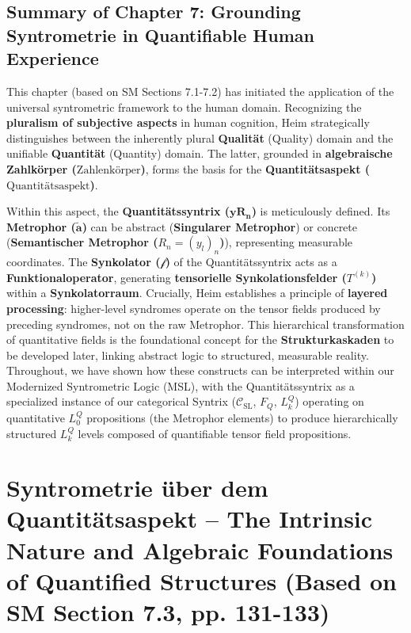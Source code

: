 \documentclass[
    12pt,              %
    a4paper,           %
    headings=normal,   %
    twoside=true,      %
    BCOR=8mm,          %
]{scrbook}
\newcommand{\metrophor}{\bm{\widetilde{a}}}
\newcommand{\quantitaetsaspekt}{\text{Quantitätsaspekt}}
\newcommand{\quantitaetssyntrix}{\bm{yR_n}}
\newcommand{\zahlenkoerper}{\text{Zahlenkörper}}
\newcommand{\semantischermetrophor}{R_n}
\newcommand{\funktionaloperator}{\mathcal{f}}
\begin{document}
\section{Summary of Chapter 7: Grounding Syntrometrie in Quantifiable Human Experience}
\label{sec:ch7_3_summary}

This chapter (based on SM Sections 7.1-7.2) has initiated the application of the universal syntrometric framework to the human domain. Recognizing the \textbf{pluralism of subjective aspects} in human cognition, Heim strategically distinguishes between the inherently plural \textbf{Qualität} (Quality) domain and the unifiable \textbf{Quantität} (Quantity) domain. The latter, grounded in \textbf{algebraische Zahlkörper (\(\zahlenkoerper\))}, forms the basis for the \textbf{Quantitätsaspekt (\(\quantitaetsaspekt\))}.

Within this aspect, the \textbf{Quantitätssyntrix (\(\quantitaetssyntrix\))} is meticulously defined. Its \textbf{Metrophor (\(\metrophor\))} can be abstract (\textbf{Singularer Metrophor}) or concrete (\textbf{Semantischer Metrophor (\(\semantischermetrophor = (y_l)_n\))}), representing measurable coordinates. The \textbf{Synkolator (\(\funktionaloperator\))} of the Quantitätssyntrix acts as a \textbf{Funktionaloperator}, generating \textbf{tensorielle Synkolationsfelder (\(T^{(k)}\))} within a \textbf{Synkolatorraum}. Crucially, Heim establishes a principle of \textbf{layered processing}: higher-level syndromes operate on the tensor fields produced by preceding syndromes, not on the raw Metrophor. This hierarchical transformation of quantitative fields is the foundational concept for the \textbf{Strukturkaskaden} to be developed later, linking abstract logic to structured, measurable reality. Throughout, we have shown how these constructs can be interpreted within our Modernized Syntrometric Logic (MSL), with the Quantitätssyntrix as a specialized instance of our categorical Syntrix (\(\mathcal{C}_{\text{SL}}\), \(F_Q\), \(L_k^Q\)) operating on quantitative \(L_0^Q\) propositions (the Metrophor elements) to produce hierarchically structured \(L_k^Q\) levels composed of quantifiable tensor field propositions.

\clearpage
\chapter{Syntrometrie über dem Quantitätsaspekt – The Intrinsic Nature and Algebraic Foundations of Quantified Structures (Based on SM Section 7.3, pp. 131-133)}
\label{sec:ch8_main}
\end{document}
